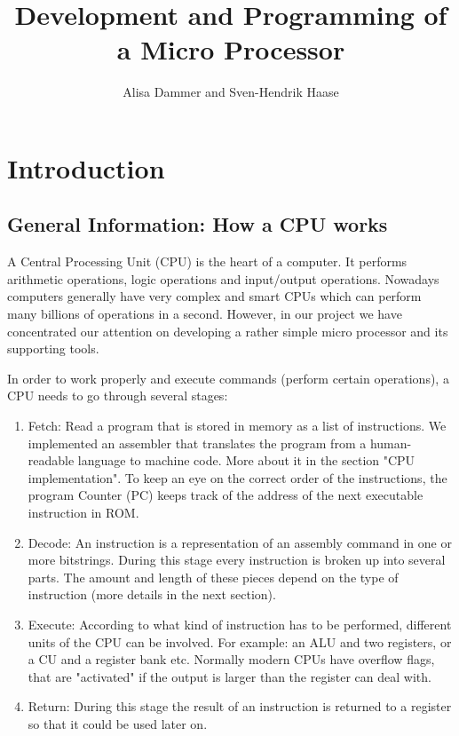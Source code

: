\documentclass[12pt,a4paper]{scrartcl}
\begin{document}
\title{Development and Programming of a Micro Processor}
\author{Alisa Dammer and Sven-Hendrik Haase}
\maketitle

\tableofcontents

\newpage

\section{Introduction}
\subsection{General Information: How a CPU works}
A Central Processing Unit (CPU) is the heart of a computer. It performs arithmetic operations, logic operations and input/output operations. Nowadays computers generally have very complex and smart CPUs which can perform many billions of operations in a second. However, in our project we have concentrated our attention on developing a rather simple micro processor and its supporting tools.

In order to work properly and execute commands (perform certain operations), a CPU needs to go through several stages:
\begin{enumerate}
	\item Fetch: Read a program that is stored in memory as a list of instructions. We implemented an assembler that translates the program from a human-readable language to machine code. More about it in the section "CPU implementation". To keep an eye on the correct order of the instructions, the program Counter (PC) keeps track of the address of the next executable instruction in ROM.
	\item Decode: An instruction is a representation of an assembly command in one or more bitstrings. During this stage every instruction is broken up into several parts. The amount and length of these pieces depend on the type of instruction (more details in the next section). 
	\item Execute: According to what kind of instruction has to be performed, different units of the CPU can be involved. For example: an ALU and two registers, or a CU and a register bank etc. Normally modern CPUs have overflow flags, that are "activated" if the output is larger than the register can deal with.
	\item Return: During this stage the result of an instruction is returned to a register so that it could be used later on.
\end{enumerate}
\end{document}
